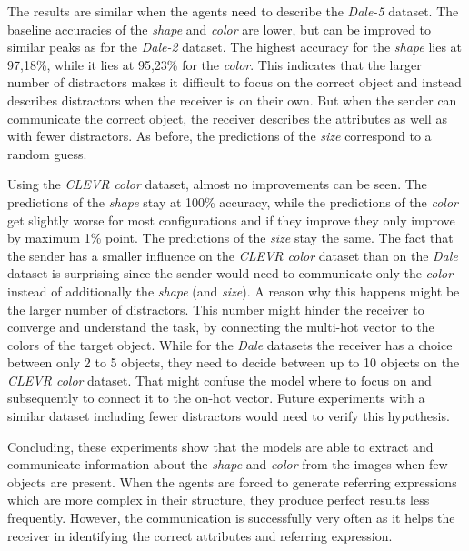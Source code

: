 The results are similar when the agents need to describe the \emph{Dale-5} dataset.
The baseline accuracies of the \emph{shape} and \emph{color} are lower, but can be improved to similar peaks as for the \emph{Dale-2} dataset.
The highest accuracy for the \emph{shape} lies at 97,18\%, while it lies at 95,23\% for the \emph{color}.
This indicates that the larger number of distractors makes it difficult to focus on the correct object and instead describes distractors when the receiver is on their own.
But when the sender can communicate the correct object, the receiver describes the attributes as well as with fewer distractors.
As before, the predictions of the \emph{size} correspond to a random guess.

Using the \emph{CLEVR color} dataset, almost no improvements can be seen.
The predictions of the \emph{shape} stay at 100\% accuracy, while the predictions of the \emph{color} get slightly worse for most configurations and if they improve they only improve by maximum 1\% point.
The predictions of the \emph{size} stay the same.
The fact that the sender has a smaller influence on the \emph{CLEVR color} dataset than on the \emph{Dale} dataset is surprising since the sender would need to communicate only the \emph{color} instead of additionally the \emph{shape} (and \emph{size}).
A reason why this happens might be the larger number of distractors.
This number might hinder the receiver to converge and understand the task, by connecting the multi-hot vector to the colors of the target object.
While for the \emph{Dale} datasets the receiver has a choice between only 2 to 5 objects, they need to decide between up to 10 objects on the \emph{CLEVR color} dataset.
That might confuse the model where to focus on and subsequently to connect it to the on-hot vector.
Future experiments with a similar dataset including fewer distractors would need to verify this hypothesis.

Concluding, these experiments show that the models are able to extract and communicate information about the \emph{shape} and \emph{color} from the images when few objects are present.
When the agents are forced to generate referring expressions which are more complex in their structure, they produce perfect results less frequently.
However, the communication is successfully very often as it helps the receiver in identifying the correct attributes and referring expression.